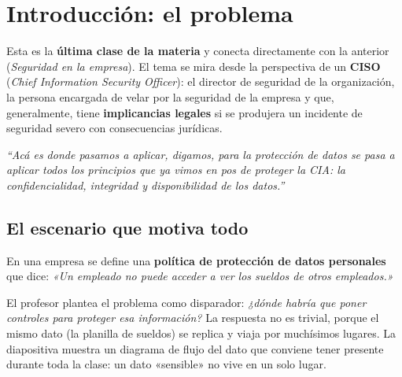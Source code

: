 \documentclass[11pt,a4paper]{article}
\newcommand{\prof}[1]{%
  \medskip\noindent\hspace*{1em}\textit{``#1''}\\[-1pt]%
  \hspace*{1em}{\footnotesize\textcolor{black!55}{--- Prof.\ Leandro Suárez (clase teórica)}}\medskip}
\begin{document}
\tableofcontents
\newpage

\section{Introducción: el problema}

Esta es la \textbf{última clase de la materia} y conecta directamente con la anterior
(\emph{Seguridad en la empresa}). El tema se mira desde la perspectiva de un
\textbf{CISO} (\emph{Chief Information Security Officer}): el director de seguridad de la
organización, la persona encargada de velar por la seguridad de la empresa y que,
generalmente, tiene \textbf{implicancias legales} si se produjera un incidente de
seguridad severo con consecuencias jurídicas.

\prof{Acá es donde pasamos a aplicar, digamos, para la protección de datos se pasa a aplicar
todos los principios que ya vimos en pos de proteger la CIA: la confidencialidad, integridad
y disponibilidad de los datos.}

\subsection{El escenario que motiva todo}

\begin{slidebox}
En una empresa se define una \textbf{política de protección de datos personales} que dice:
\emph{«Un empleado no puede acceder a ver los sueldos de otros empleados.»}
\end{slidebox}

El profesor plantea el problema como disparador: \emph{¿dónde habría que poner controles
para proteger esa información?} La respuesta no es trivial, porque el mismo dato (la planilla
de sueldos) se replica y viaja por muchísimos lugares. La diapositiva muestra un diagrama
de flujo del dato que conviene tener presente durante toda la clase: un dato «sensible» no
vive en un solo lugar.
\end{document}
